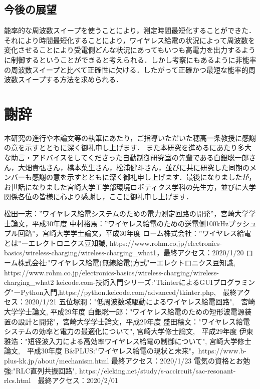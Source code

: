 \documentclass[12pt]{jarticle}
\begin{document}
\subsection{今後の展望}
能率的な周波数スイープを使うことにより，測定時間最短化することができた．それにより時間最短化することにより，ワイヤレス給電の状況によって周波数を変化させることにより受電側どんな状況にあってもいつも高電力を出力するように制御するということができると考えられる．しかし考察にもあるように非能率の周波数スイープと比べて正確性に欠ける．したがって正確かつ最短な能率的周波数スイープする方法を求められる．
\clearpage
\section{謝辞}
 本研究の進行や本論文等の執筆にあたり，ご指導いただいた穂高一条教授に感謝の意を示すとともに深く御礼申し上げます．
また本研究を進めるにあたり多大な助言・アドバイスをしてくださった自動制御研究室の先輩である白銀聡一郎さん，大畑貴弘さん，橋本菜生さん，松浦健斗さん，並びに共に研究した同期のメンバーも感謝の意を示すとともに深く御礼申し上げます．最後になりましたが，お世話になりました宮崎大学工学部環境ロボティクス学科の先生方，並びに大学関係各位の皆様に心より感謝し，ここに御礼申し上げます．

\begin{thebibliography}{50}
	松田一志：”ワイヤレス給電システムのための電力測定回路の開発”，宮崎大学学士論文，平成30年度
	中村裕馬：”ワイヤレス給電のための送電側100kHzプッシュプル回路”，宮崎大学学士論文，平成30年度
	ローム株式会社：”ワイヤレス給電とは”ーエレクトロニクス豆知識, https://www.rohm.co.jp/electronics-basics/wireless-charging/wireless-charging\_what1，最終アクセス：2020/1/20
	ローム株式会社:"ワイヤレス給電(無線給電)方式"ーエレクトロニクス豆知識, https://www.rohm.co.jp/electronics-basics/wireless-charging/wireless-charging\_what2
	keicode.com-技術入門シリーズ:"TkinterによるGUIプログラミング"ーPython入門,https://python.keicode.com/advanced/tkinter.php,　最終アクセス：2020/1/21
	五位塚潤："低周波数域駆動によるワイヤレス給電回路",　宮崎大学学士論文, 平成29年度
	白銀聡一郎："ワイヤレス給電のための短形波電源装置の設計と開発"，宮崎大学学士論文，平成29年度
	盛田穣文："ワイヤレス給電システムの効率と電力の最適化について", 宮崎大学修士論文,　平成29年度
	伊東雅浩："短径波入力による高効率ワイヤレス給電の制御について", 宮崎大学修士論文,　平成30年度
	B\&PLUS:"ワイヤレス給電の現状と未来"，https://www.b-plus-kk.jp/about/mechanism.html 最終アクセス：2020/1/23
	電気の資格とお勉強:"RLC直列共振回路", https://eleking.net/study/s-accircuit/sac-resonant-rlcs.html　最終アクセス：2020/2/01
\end{thebibliography}
\clearpage
\end{document}
